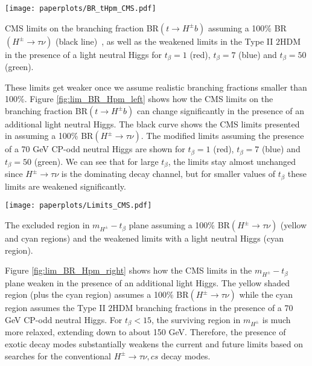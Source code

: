 \begin{marginfigure}
 	\texttt{[image: paperplots/BR\_tHpm\_CMS.pdf]}
    \caption{CMS limits on the branching fraction BR$( t \rightarrow H^{\pm}b)$ assuming a 100\% BR$(H^{\pm} \rightarrow \tau \nu)$ (black line)~\cite{CMS:2014cdp}, as well as the weakened limits in the Type II $2$HDM in the presence of a light neutral Higgs for $t_{\beta}=1$ (red), $t_{\beta}=7$ (blue) and $t_{\beta}=50$ (green).}
\label{fig:lim_BR_Hpm_left}
\end{marginfigure}

These limits get weaker once we assume realistic branching fractions smaller than 100\%. Figure \ref{fig:lim_BR_Hpm_left} shows how the CMS limits on the branching fraction BR$(t \rightarrow H^{\pm} b)$ can change significantly in the presence of an additional light neutral Higgs. The black curve shows the CMS limits presented in \cite{CMS:2014cdp} assuming a 100\% BR$(H^{\pm} \rightarrow \tau \nu)$. The modified limits assuming the presence of a 70 GeV CP-odd neutral Higgs are shown for $t_{\beta}=1$ (red), $t_{\beta}=7$ (blue) and $t_{\beta}=50$ (green). We can see that for large $t_{\beta}$, the limits stay almost unchanged since $H^{\pm} \rightarrow \tau \nu$ is the dominating decay channel, but for smaller values of $t_{\beta}$ these limits are weakened significantly.

\begin{marginfigure}
 	\texttt{[image: paperplots/Limits\_CMS.pdf]}
    \caption{The excluded region in $m_{H^\pm}-t_{\beta}$ plane assuming a 100\% BR$(H^{\pm} \rightarrow \tau \nu)$ (yellow and cyan regions) and the weakened limits with a light neutral Higgs (cyan region).}
\label{fig:lim_BR_Hpm_right}
\end{marginfigure}

Figure \ref{fig:lim_BR_Hpm_right} shows how the CMS limits in the $m_{H^{\pm}}-t_{\beta}$ plane weaken in the presence of an additional light Higgs. The yellow shaded region (plus the cyan region) assumes a 100\% BR$(H^{\pm} \rightarrow \tau \nu)$ while the cyan region assumes the Type II $2$HDM branching fractions in the presence of a 70 GeV CP-odd neutral Higgs.  For $t_{\beta}<15$, the surviving region in $m_{H^{\pm}}$ is much more relaxed, extending down to about 150 GeV. Therefore, the presence of exotic decay modes substantially weakens the current and future limits based on searches for the conventional $H^{\pm} \rightarrow \tau \nu, cs$ decay modes. 


